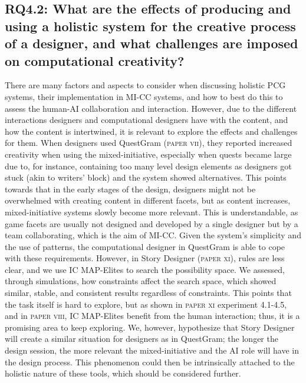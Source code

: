 





\subsection[Research Question 4.2]{RQ4.2: What are the effects of producing and using a holistic system for the creative process of a designer, and what challenges are imposed on computational creativity?}

There are many factors and aspects to consider when discussing holistic PCG systems, their implementation in MI-CC systems, and how to best do this to assess the human-AI collaboration and interaction. However, due to the different interactions designers and computational designers have with the content, and how the content is intertwined, it is relevant to explore the effects and challenges for them. When designers used QuestGram (\textsc{paper vii}), they reported increased creativity when using the mixed-initiative, especially when quests became large due to, for instance, containing too many level design elements as designers got stuck (akin to writers' block) and the system showed alternatives. This points towards that in the early stages of the design, designers might not be overwhelmed with creating content in different facets, but as content increases, mixed-initiative systems slowly become more relevant. This is understandable, as game facets are usually not designed and developed by a single designer but by a team collaborating, which is the aim of MI-CC. Given the system's simplicity and the use of patterns, the computational designer in QuestGram is able to cope with these requirements. However, in Story Designer (\textsc{paper xi}), rules are less clear, and we use IC MAP-Elites to search the possibility space. We assessed, through simulations, how constraints affect the search space, which showed similar, stable, and consistent results regardless of constraints. This points that the task itself is hard to explore, but as shown in \textsc{paper xi} experiment 4.1-4.5, and in \textsc{paper viii}, IC MAP-Elites benefit from the human interaction; thus, it is a promising area to keep exploring. We, however, hypothesize that Story Designer will create a similar situation for designers as in QuestGram; the longer the design session, the more relevant the mixed-initiative and the AI role will have in the design process. This phenomenon could then be intrinsically attached to the holistic nature of these tools, which should be considered further.

